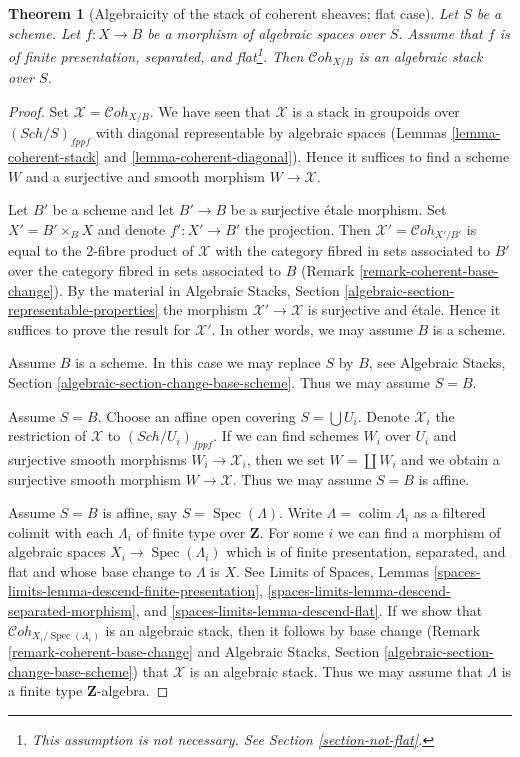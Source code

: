 \documentclass{stacks-project}
\theoremstyle{plain}
\newtheorem{theorem}[subsection]{Theorem}
\theoremstyle{definition}
\theoremstyle{remark}
\numberwithin{equation}{subsection}
\def\colim{\mathop{\mathrm{colim}}\nolimits}
\def\Spec{\mathop{\mathrm{Spec}}}
\def\Sch{\mathit{Sch}}
\def\Cohstack{\mathcal{C}\!\mathit{oh}}
\begin{document}
\begin{theorem}[Algebraicity of the stack of coherent sheaves; flat case]
\label{theorem-coherent-algebraic}
Let $S$ be a scheme. Let $f : X \to B$ be a morphism of algebraic spaces
over $S$. Assume that $f$ is of finite presentation, separated, and
flat\footnote{This assumption is not necessary. See
Section \ref{section-not-flat}.}. Then $\Cohstack_{X/B}$ is
an algebraic stack over $S$.
\end{theorem}

\begin{proof}
Set $\mathcal{X} = \Cohstack_{X/B}$. We have seen that $\mathcal{X}$
is a stack in groupoids over $(\Sch/S)_{fppf}$ with diagonal representable
by algebraic spaces
(Lemmas \ref{lemma-coherent-stack} and \ref{lemma-coherent-diagonal}).
Hence it suffices to find a scheme $W$ and a surjective and smooth
morphism $W \to \mathcal{X}$.

\medskip\noindent
Let $B'$ be a scheme and let $B' \to B$ be a surjective \'etale morphism.
Set $X' = B' \times_B X$ and denote $f' : X' \to B'$ the projection.
Then $\mathcal{X}' = \Cohstack_{X'/B'}$ is equal to the $2$-fibre
product of $\mathcal{X}$ with the category fibred in sets
associated to $B'$ over the category fibred in sets associated to $B$
(Remark \ref{remark-coherent-base-change}). By the material in
Algebraic Stacks, Section \ref{algebraic-section-representable-properties}
the morphism $\mathcal{X}' \to \mathcal{X}$ is surjective and \'etale.
Hence it suffices to prove the result for $\mathcal{X}'$.
In other words, we may assume $B$ is a scheme.

\medskip\noindent
Assume $B$ is a scheme. In this case we may replace $S$ by $B$, see
Algebraic Stacks, Section \ref{algebraic-section-change-base-scheme}.
Thus we may assume $S = B$.

\medskip\noindent
Assume $S = B$. Choose an affine open covering $S = \bigcup U_i$.
Denote $\mathcal{X}_i$ the restriction of $\mathcal{X}$ to
$(\Sch/U_i)_{fppf}$. If we can find schemes $W_i$ over $U_i$ and
surjective smooth morphisms $W_i \to \mathcal{X}_i$, then we
set $W = \coprod W_i$ and we obtain a surjective smooth morphism
$W \to \mathcal{X}$. Thus we may assume $S = B$ is affine.

\medskip\noindent
Assume $S = B$ is affine, say $S = \Spec(\Lambda)$.
Write $\Lambda = \colim \Lambda_i$ as a filtered colimit with each $\Lambda_i$
of finite type over $\mathbf{Z}$. For some $i$ we can find
a morphism of algebraic spaces $X_i \to \Spec(\Lambda_i)$
which is of finite presentation, separated, and flat and whose base change
to $\Lambda$ is $X$. See
Limits of Spaces, Lemmas
\ref{spaces-limits-lemma-descend-finite-presentation},
\ref{spaces-limits-lemma-descend-separated-morphism}, and
\ref{spaces-limits-lemma-descend-flat}.
If we show that $\Cohstack_{X_i/\Spec(\Lambda_i)}$ is an
algebraic stack, then it follows by base change
(Remark \ref{remark-coherent-base-change} and
Algebraic Stacks, Section \ref{algebraic-section-change-base-scheme})
that $\mathcal{X}$ is an algebraic stack.
Thus we may assume that $\Lambda$ is a finite type $\mathbf{Z}$-algebra.


\end{proof}
\end{document}
